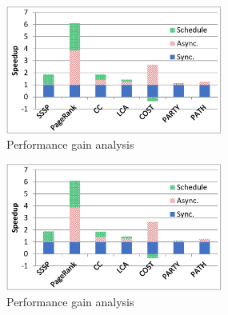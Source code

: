 \documentclass{vldb}
\begin{document}
\begin{figure}[!t]
\vspace{-0.1in}
	\centering
	\includegraphics[width=2.8in]{fig/single-optimize}
	\caption{Performance gain analysis}
	\label{fig:single-optimize}
	\vspace{-0.0in}
\end{figure}

\begin{figure}[!t]
	\centering
	\includegraphics[width=2.8in]{fig/single-optimize}
	\caption{Performance gain analysis}
	\label{fig:single-optimize}
	\vspace{-0.2in}
\end{figure}
\end{document}
